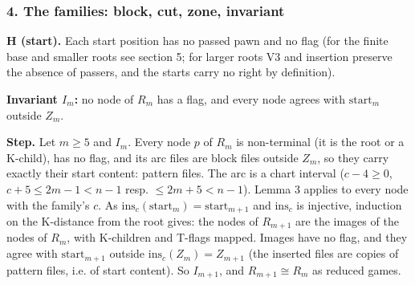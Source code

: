 \subsubsection*{4. The families: block, cut, zone, invariant}
\par{}\par\smallskip
\textbf{H (start).} Each start position has no passed pawn and no flag (for the finite base and smaller roots see section 5; for larger roots V3 and insertion preserve the absence of passers, and the starts carry no right by definition).

\textbf{Invariant $I_m$:} no node of $R_m$ has a flag, and every node agrees with $\mathrm{start}_m$ outside $Z_m$.

\textbf{Step.} Let $m\ge5$ and $I_m$. Every node $p$ of $R_m$ is non-terminal (it is the root or a K-child), has no flag, and its arc files are block files outside $Z_m$, so they carry exactly their start content: pattern files. The arc is a chart interval ($c-4\ge0$, $c+5\le 2m-1<n-1$ resp. $\le 2m+5<n-1$). Lemma 3 applies to every node with the family's $c$. As $\mathrm{ins}_c(\mathrm{start}_m)=\mathrm{start}_{m+1}$ and $\mathrm{ins}_c$ is injective, induction on the K-distance from the root gives: the nodes of $R_{m+1}$ are the images of the nodes of $R_m$, with K-children and T-flags mapped. Images have no flag, and they agree with $\mathrm{start}_{m+1}$ outside $\mathrm{ins}_c(Z_m)=Z_{m+1}$ (the inserted files are copies of pattern files, i.e. of start content). So $I_{m+1}$, and $R_{m+1}\cong R_m$ as reduced games.

